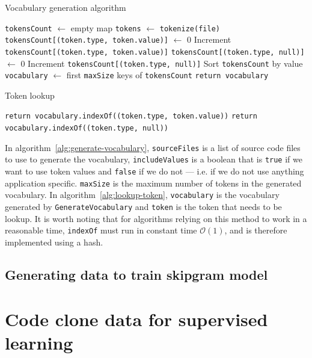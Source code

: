 \begin{algorithm}
  \caption{\label{alg:generate-vocabulary}Vocabulary generation algorithm}
  \begin{algorithmic}[1]
      \State \lstinline{tokensCount} $\gets$ empty map
        \State \lstinline{tokens} $\gets$ \lstinline{tokenize(file)}
            \State \lstinline{tokensCount[(token.type, token.value)]} $\gets$ 0
          \EndIf
          \State Increment \lstinline{tokensCount[(token.type, token.value)]}
              \State \lstinline{tokensCount[(token.type, null)]} $\gets$ 0
            \EndIf
            \State Increment \lstinline{tokensCount[(token.type, null)]}
          \EndIf
        \EndFor
      \EndFor
      \State Sort \lstinline{tokensCount} by value
      \State \lstinline{vocabulary} $\gets$ first \lstinline{maxSize} keys of \lstinline{tokensCount}
      \State \lstinline{return vocabulary}
    \EndFunction%
  \end{algorithmic}
\end{algorithm}

\begin{algorithm}
  \caption{\label{alg:lookup-token}Token lookup}
  \begin{algorithmic}[1]
        \State \lstinline{return vocabulary.indexOf((token.type, token.value))}
      \EndIf
      \State \lstinline{return vocabulary.indexOf((token.type, null))}
    \EndFunction%
  \end{algorithmic}
\end{algorithm}

In algorithm~\ref{alg:generate-vocabulary}, \lstinline{sourceFiles} is a list of
source code files to use to generate the vocabulary, \lstinline{includeValues}
is a boolean that is \lstinline{true} if we want to use token values and
\lstinline{false} if we do not --- i.e. if we do not use anything application
specific. \lstinline{maxSize} is the maximum number of tokens in the generated
vocabulary. In algorithm~\ref{alg:lookup-token}, \lstinline{vocabulary} is the
vocabulary generated by \lstinline{GenerateVocabulary} and \lstinline{token} is
the token that needs to be lookup. It is worth noting that for algorithms
relying on this method to work in a reasonable time, \lstinline{indexOf} must
run in constant time $\mathcal{O}(1)$, and is therefore implemented using a
hash.
\subsection{Generating data to train skipgram model}
\section{\label{sec:code-clone-data}Code clone data for supervised learning}
